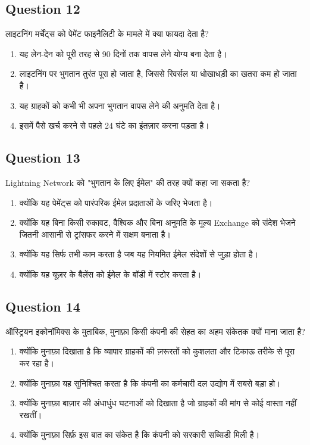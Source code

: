\documentclass[12pt,a4paper]{article}
\begin{document}
\bigskip


\subsection*{Question 12}
लाइटनिंग मर्चेंट्स को पेमेंट फाइनैलिटी के मामले में क्या फायदा देता है?

\begin{enumerate}[label=\Alph*., leftmargin=*]
\item यह लेन-देन को पूरी तरह से 90 दिनों तक वापस लेने योग्य बना देता है।
\item लाइटनिंग पर भुगतान तुरंत पूरा हो जाता है, जिससे रिवर्सल या धोखाधड़ी का खतरा कम हो जाता है।
\item यह ग्राहकों को कभी भी अपना भुगतान वापस लेने की अनुमति देता है।
\item इसमें पैसे खर्च करने से पहले 24 घंटे का इंतज़ार करना पड़ता है।
\end{enumerate}

\bigskip


\subsection*{Question 13}
Lightning Network को "भुगतान के लिए ईमेल" की तरह क्यों कहा जा सकता है?

\begin{enumerate}[label=\Alph*., leftmargin=*]
\item क्योंकि यह पेमेंट्स को पारंपरिक ईमेल प्रदाताओं के जरिए भेजता है।
\item क्योंकि यह बिना किसी रुकावट, वैश्विक और बिना अनुमति के मूल्य Exchange को संदेश भेजने जितनी आसानी से ट्रांसफर करने में सक्षम बनाता है।
\item क्योंकि यह सिर्फ तभी काम करता है जब यह नियमित ईमेल संदेशों से जुड़ा होता है।
\item क्योंकि यह यूज़र के बैलेंस को ईमेल के बॉडी में स्टोर करता है।
\end{enumerate}

\bigskip


\subsection*{Question 14}
ऑस्ट्रियन इकोनॉमिक्स के मुताबिक, मुनाफ़ा किसी कंपनी की सेहत का अहम संकेतक क्यों माना जाता है?

\begin{enumerate}[label=\Alph*., leftmargin=*]
\item क्योंकि मुनाफ़ा दिखाता है कि व्यापार ग्राहकों की ज़रूरतों को कुशलता और टिकाऊ तरीके से पूरा कर रहा है।
\item क्योंकि मुनाफ़ा यह सुनिश्चित करता है कि कंपनी का कर्मचारी दल उद्योग में सबसे बड़ा हो।
\item क्योंकि मुनाफ़ा बाज़ार की अंधाधुंध घटनाओं को दिखाता है जो ग्राहकों की मांग से कोई वास्ता नहीं रखतीं।
\item क्योंकि मुनाफ़ा सिर्फ़ इस बात का संकेत है कि कंपनी को सरकारी सब्सिडी मिली है।
\end{enumerate}
\end{document}
